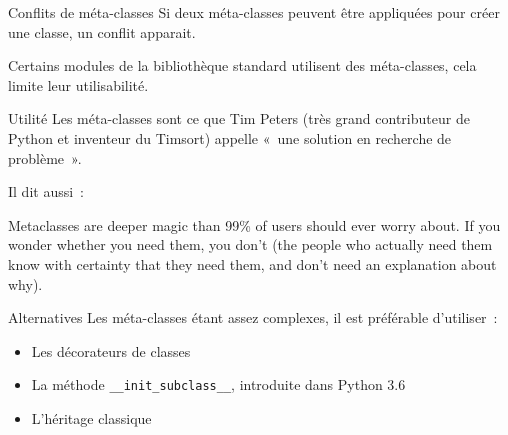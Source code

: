 \begin{frame}{Conflits de méta-classes}
  Si deux méta-classes peuvent être appliquées pour créer une classe, un conflit apparait.

  Certains modules de la bibliothèque standard utilisent des méta-classes, cela limite leur utilisabilité.
\end{frame}

\begin{frame}{Utilité}
  Les méta-classes sont ce que Tim Peters (très grand contributeur de Python et inventeur du Timsort) appelle «~une solution en recherche de problème~».

  Il dit aussi~:

  Metaclasses are deeper magic than 99\% of users should ever worry about. If you wonder whether you need them, you don't (the people who actually need them know with certainty that they need them, and don't need an explanation about why).
\end{frame}

\begin{frame}{Alternatives}
  Les méta-classes étant assez complexes, il est préférable d'utiliser~:

  \begin{itemize}[<+->]
    \item Les décorateurs de classes
    \item La méthode \texttt{\_\_init\_subclass\_\_}, introduite dans Python 3.6
    \item L'héritage classique
  \end{itemize}
\end{frame}
